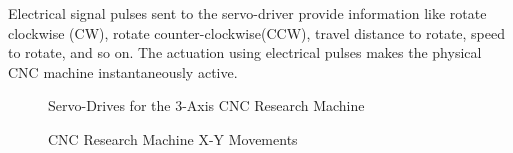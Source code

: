 Electrical signal pulses sent to the servo-driver provide information like rotate clockwise (CW), rotate counter-clockwise(CCW), travel distance to rotate, speed to rotate, and so on. The actuation using electrical pulses makes the physical CNC machine instantaneously active. 

\clearpage
\pagebreak

\begin{figure}[htbp]
	\begin{center}
		\caption{Servo-Drives for the 3-Axis CNC Research Machine}
		\label{fig:CNC-Research-Machine-3-Sets-Servo-Drives.jpg}
	\end{center}
\end{figure}

\begin{figure}[htbp]
	\begin{center}
		\caption{CNC Research Machine X-Y Movements}
		\label{fig:CNC-Research-Machine-X-Y-Movements.jpg}
	\end{center}
\end{figure}


